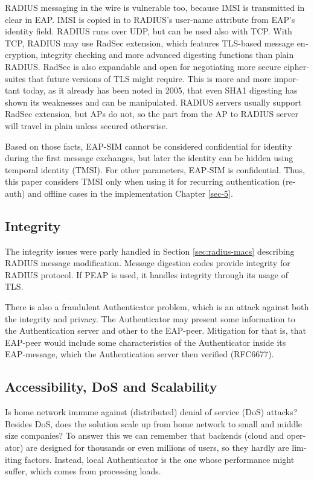 \documentclass[12pt,a4paper,english]{tutthesis}
\begin{document}
\begin{otherlanguage}{english}
RADIUS messaging in the wire is vulnerable too, because IMSI is transmitted in clear 
in EAP. IMSI is copied in to RADIUS's user-name attribute from EAP's identity field.
RADIUS runs over UDP, but can be used also with TCP. With TCP, RADIUS
may use RadSec extension, which features TLS-based message encryption,
integrity checking and more advanced digesting functions than plain
RADIUS.
RadSec is also expandable and open 
for negotiating more secure ciphersuites that future 
versions of TLS might require\cite{rfc6614}. This is
more and more important today, as it already has been noted in 2005,
that even SHA1 digesting has shown its weaknesses and can be manipulated.
RADIUS servers usually support RadSec extension, but APs do not, so 
the part from the AP to RADIUS server will travel in plain unless
secured otherwise.


Based on those facts, EAP-SIM cannot be considered confidential for identity
during the first message exchanges, but later the identity can be hidden
using temporal identity (TMSI). 
For other parameters, EAP-SIM is confidential.
Thus, this paper considers TMSI only when using it for recurring
authentication (re-auth) and offline cases in the implementation Chapter
\ref{sec-5}.
\subsection{Integrity}
\label{sec-6-1-2}



The integrity issues were parly handled in Section \ref{sec:radius-macs} describing
RADIUS message modification.
Message digestion codes provide integrity for RADIUS protocol.
If PEAP is used, it handles integrity through its usage of
 TLS\cite{peap}.

There is also a fraudulent Authenticator problem, which is an attack
against both the integrity and privacy.  The Authenticator may present
some information to the Authentication server and other to the
EAP-peer. Mitigation for that is, that EAP-peer would include some
characteristics of the Authenticator inside its EAP-message, which
the Authentication server then verified (RFC6677)\cite{rfc6677}.

\subsection{Accessibility, DoS and Scalability}
\label{sec-6-1-3}

Is home network immune against (distributed) denial of service (DoS)
attacks? Besides DoS, does the solution scale up from home network to
small and middle size companies?
To answer this we can remember that backends (cloud and operator) are
designed for thousands or even millions of users, so 
they hardly are limiting factors. Instead, local
Authenticator is the one whose performance might suffer, which
comes from processing loads\cite{2009-lin-simefficiency}.



\end{otherlanguage}
\end{document}
